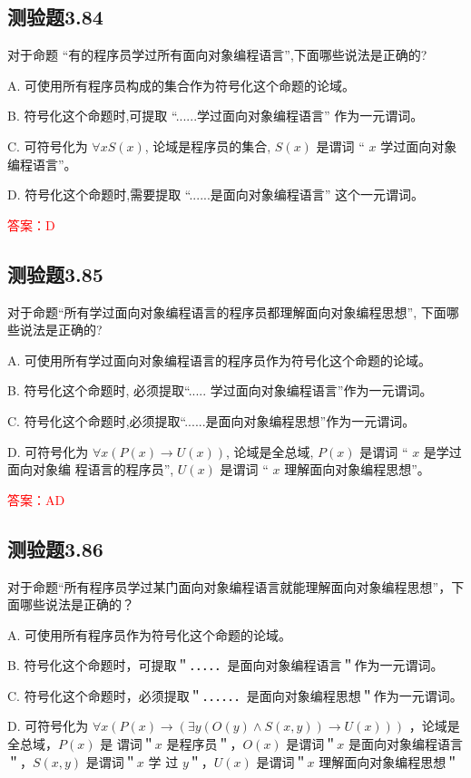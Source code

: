 \documentclass[UTF8, heading=true]{ctexart}
\begin{document}
\subsection{测验题3.84}

对于命题 “有的程序员学过所有面向对象编程语言”,下面哪些说法是正确的?

A. 可使用所有程序员构成的集合作为符号化这个命题的论域。

B. 符号化这个命题时,可提取 “......学过面向对象编程语言” 作为一元谓词。

C. 可符号化为 $\forall x S(x)$, 论域是程序员的集合, $S(x)$ 是谓词 “ $x$ 学过面向对象编程语言”。

D. 符号化这个命题时,需要提取 “......是面向对象编程语言” 这个一元谓词。

\textcolor{red}{答案：D}

\subsection{测验题3.85}

对于命题“所有学过面向对象编程语言的程序员都理解面向对象编程思想”, 下面哪些说法是正确的?

A. 可使用所有学过面向对象编程语言的程序员作为符号化这个命题的论域。

B. 符号化这个命题时, 必须提取“..... 学过面向对象编程语言”作为一元谓词。

C. 符号化这个命题时,必须提取“......是面向对象编程思想”作为一元谓词。

D. 可符号化为 $\forall x(P(x) \rightarrow U(x))$, 论域是全总域, $P(x)$ 是谓词 “ $x$ 是学过面向对象编
程语言的程序员”, $U(x)$ 是谓词 “ $x$ 理解面向对象编程思想”。

\textcolor{red}{答案：AD}

\subsection{测验题3.86}

对于命题“所有程序员学过某门面向对象编程语言就能理解面向对象编程思想”，下面哪些说法是正确的？

A. 
可使用所有程序员作为符号化这个命题的论域。

B. 
符号化这个命题时，可提取＂．．．．．是面向对象编程语言＂作为一元谓词。

C. 
符号化这个命题时，必须提取＂．．．．．．是面向对象编程思想＂作为一元谓词。

D. 
可符号化为 $\forall x(P(x) \rightarrow(\exists y(O(y) \wedge S(x, y)) \rightarrow U(x)))$ ，论域是全总域，$P(x)$ 是
谓词＂$x$ 是程序员＂，$O(x)$ 是谓词＂$x$ 是面向对象编程语言＂，$S(x, y)$ 是谓词＂$x$ 学
过 $y$＂，$U(x)$ 是谓词＂$x$ 理解面向对象编程思想＂
\end{document}
